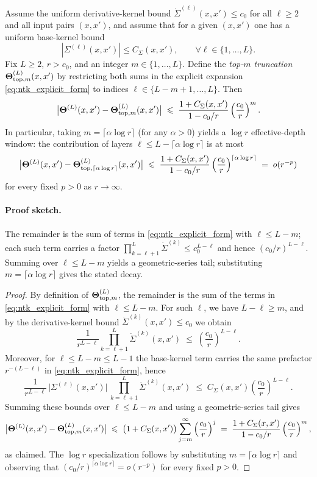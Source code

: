 \begin{proposition}\label{prop:depth_decay}
Assume the uniform derivative-kernel bound \(\dot{\Sigma}^{(\ell)}(x,x')\le c_0\) for all \(\ell\ge 2\) and all input pairs \((x,x')\), and assume that for a given \((x,x')\) one has a uniform base-kernel bound
\[
|\Sigma^{(\ell)}(x,x')|\le C_\Sigma(x,x'),\qquad \forall \ell\in\{1,\dots,L\}.
\]
Fix \(L\ge 2\), \(r>c_0\), and an integer \(m\in\{1,\dots,L\}\). Define the \emph{top-\(m\) truncation} \(\boldsymbol{\Theta}^{(L)}_{\mathrm{top},m}(x,x')\) by restricting both sums in the explicit expansion \eqref{eq:ntk_explicit_form} to indices \(\ell\in\{L-m+1,\dots,L\}\). Then
\[
\big|\boldsymbol{\Theta}^{(L)}(x,x')-\boldsymbol{\Theta}^{(L)}_{\mathrm{top},m}(x,x')\big|
\;\leqslant\;
\frac{1+C_\Sigma(x,x')}{1-c_0/r}\left(\frac{c_0}{r}\right)^m.
\]
In particular, taking \(m=\lceil \alpha \log r\rceil\) (for any \(\alpha>0\)) yields a \(\log r\) effective-depth window: the contribution of layers \(\ell\le L-\lceil \alpha \log r\rceil\) is at most
\[
\big|\boldsymbol{\Theta}^{(L)}(x,x')-\boldsymbol{\Theta}^{(L)}_{\mathrm{top},\lceil \alpha \log r\rceil}(x,x')\big|
\;\leqslant\;
\frac{1+C_\Sigma(x,x')}{1-c_0/r}\left(\frac{c_0}{r}\right)^{\lceil \alpha \log r\rceil}
\;=\;o(r^{-p})
\]
for every fixed \(p>0\) as \(r\to\infty\).
\end{proposition}
\paragraph{Proof sketch.} The remainder is the sum of terms in \eqref{eq:ntk_explicit_form} with \(\ell\le L-m\); each such term carries a factor \(\prod_{k=\ell+1}^{L}\dot{\Sigma}^{(k)}\le c_0^{L-\ell}\) and hence \((c_0/r)^{L-\ell}\). Summing over \(\ell\le L-m\) yields a geometric-series tail; substituting \(m=\lceil\alpha\log r\rceil\) gives the stated decay.
\begin{proof}
By definition of \(\boldsymbol{\Theta}^{(L)}_{\mathrm{top},m}\), the remainder is the sum of the terms in \eqref{eq:ntk_explicit_form} with \(\ell\le L-m\). For such \(\ell\), we have \(L-\ell\ge m\), and by the derivative-kernel bound \(\dot{\Sigma}^{(k)}(x,x')\le c_0\) we obtain
\[
\frac{1}{r^{L-\ell}}\prod_{k=\ell+1}^{L}\dot{\Sigma}^{(k)}(x,x')\;\le\;\left(\frac{c_0}{r}\right)^{L-\ell}.
\]
Moreover, for \(\ell\le L-m\le L-1\) the base-kernel term carries the same prefactor \(r^{-(L-\ell)}\) in \eqref{eq:ntk_explicit_form}, hence
\[
\frac{1}{r^{L-\ell}}\,\big|\Sigma^{(\ell)}(x,x')\big|\,\prod_{k=\ell+1}^{L}\dot{\Sigma}^{(k)}(x,x')
\;\le\;
C_\Sigma(x,x')\left(\frac{c_0}{r}\right)^{L-\ell}.
\]
Summing these bounds over \(\ell\le L-m\) and using a geometric-series tail gives
\[
\big|\boldsymbol{\Theta}^{(L)}(x,x')-\boldsymbol{\Theta}^{(L)}_{\mathrm{top},m}(x,x')\big|
\;\leqslant\;
\bigl(1+C_\Sigma(x,x')\bigr)\sum_{j=m}^{\infty}\left(\frac{c_0}{r}\right)^j
\;=\;
\frac{1+C_\Sigma(x,x')}{1-c_0/r}\left(\frac{c_0}{r}\right)^m,
\]
as claimed. The \(\log r\) specialization follows by substituting \(m=\lceil \alpha \log r\rceil\) and observing that \((c_0/r)^{\lceil \alpha \log r\rceil}=o(r^{-p})\) for every fixed \(p>0\).
\end{proof}

